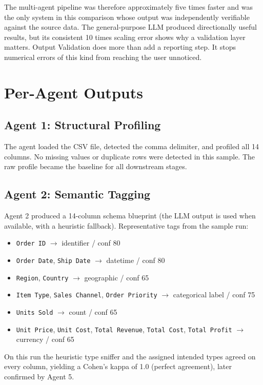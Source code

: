 \documentclass[12pt,a4paper,openany]{report}
\begin{document}
The multi-agent pipeline was therefore approximately five times faster and was the only system in this comparison whose output was independently verifiable against the source data. The general-purpose LLM produced directionally useful results, but its consistent 10 times scaling error shows why a validation layer matters. Output Validation does more than add a reporting step. It stops numerical errors of this kind from reaching the user unnoticed.

\section{Per-Agent Outputs}

\subsection{Agent 1: Structural Profiling}
The agent loaded the CSV file, detected the comma delimiter, and profiled all 14 columns. No missing values or duplicate rows were detected in this sample. The raw profile became the baseline for all downstream stages.

\subsection{Agent 2: Semantic Tagging}
Agent 2 produced a 14-column schema blueprint (the LLM output is used when available, with a heuristic fallback). Representative tags from the sample run:
\begin{itemize}
	\item \texttt{Order ID} $\rightarrow$ identifier / conf 80
	\item \texttt{Order Date}, \texttt{Ship Date} $\rightarrow$ datetime / conf 80
	\item \texttt{Region}, \texttt{Country} $\rightarrow$ geographic / conf 65
	\item \texttt{Item Type}, \texttt{Sales Channel}, \texttt{Order Priority} $\rightarrow$ categorical label / conf 75
	\item \texttt{Units Sold} $\rightarrow$ count / conf 65
	\item \texttt{Unit Price}, \texttt{Unit Cost}, \texttt{Total Revenue}, \texttt{Total Cost}, \texttt{Total Profit} $\rightarrow$ currency / conf 65
\end{itemize}
On this run the heuristic type sniffer and the assigned intended types agreed on every column, yielding a Cohen's kappa of 1.0 (perfect agreement), later confirmed by Agent 5.
\end{document}
